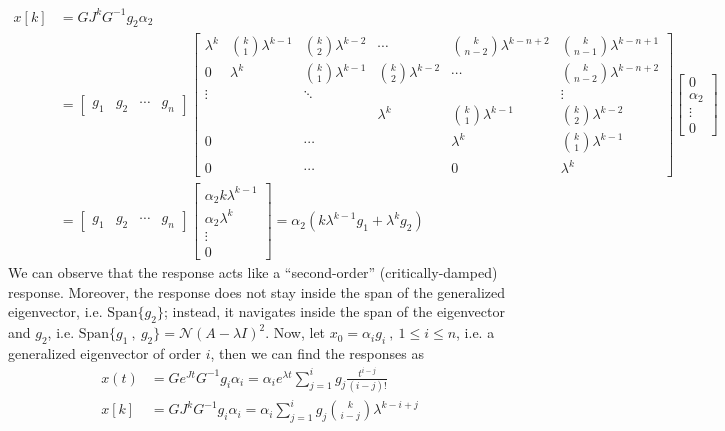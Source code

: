 \documentclass[twoside]{article}
\begin{document}
\begin{align*}
    x[k] &= G J^k G^{-1} g_2 \alpha_2 
    \\
    &= \begin{bmatrix} g_1 & g_2 & \cdots & g_n \end{bmatrix} 
\begin{bmatrix} \lambda^k & \binom{k}{1} \lambda^{k-1} & \binom{k}{2}  \lambda^{k-2} & \cdots & \binom{k}{n-2} \lambda^{k-n+2} & \binom{k}{n-1} \lambda^{k-n+1} \\
0 & \lambda^k & \binom{k}{1}  \lambda^{k-1} & \binom{k}{2} \lambda^{k-2} & \cdots  & \binom{k}{n-2} \lambda^{k-n+2} \\
\vdots & & \ddots & & & \vdots \\
& & & \lambda^k & \binom{k}{1} \lambda^{k-1} & \binom{k}{2} \lambda^{k-2} \\
0 & & \cdots & & \lambda^k & \binom{k}{1} \lambda^{k-1} \\
0 & & \cdots & & 0 & \lambda^k \end{bmatrix}
%
    \begin{bmatrix} 0 \\ \alpha_2 \\ \vdots \\ 0 \end{bmatrix} 
    \\[1ex] 
    &= \begin{bmatrix} g_1 & g_2 & \cdots & g_n \end{bmatrix} \begin{bmatrix} \alpha_2 k \lambda^{k-1} \\ \alpha_2 \lambda^k \\ \vdots \\ 0 \end{bmatrix} = \alpha_2 \left( k \lambda^{k-1} g_1  + \lambda^k g_2 \right)
\end{align*}
%
We can observe that the response acts like a ``second-order'' (critically-damped) response. Moreover, the response does not stay inside the span of the 
generalized eigenvector, i.e. $\mathrm{Span} \lbrace g_2 \rbrace$; instead, it navigates inside the span of the eigenvector and $g_2$, i.e. 
$\mathrm{Span} \lbrace g_1 \ , \ g_2 \rbrace = \mathcal{N}(A - \lambda I)^2$. Now, let $x_0 = \alpha_i g_i \ , \ 1 \leq i \leq n$, i.e. a generalized eigenvector
of order $i$, then we can find the responses as
%
\begin{align*}
x(t) &= G e^{J t} G^{-1} g_i \alpha_i = \alpha_i e^{\lambda t} \sum\limits_{j=1}^{i}  g_j \frac{t^{i-j}}{(i-j)!}
\\[1ex]
x[k] &= G J^k G^{-1} g_i \alpha_i = \alpha_i \sum\limits_{j=1}^{i}  g_j \binom{k}{i-j} \lambda^{k-i+j}  
\end{align*}
\end{document}
